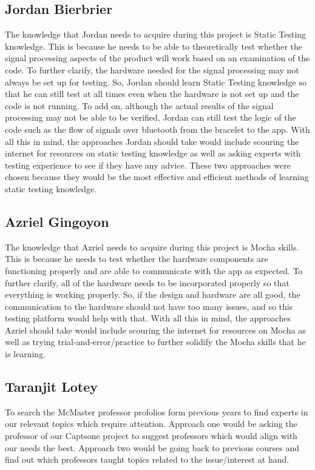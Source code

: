 \documentclass[12pt, titlepage]{article}
\begin{document}
\subsection*{Jordan Bierbrier}
The knowledge that Jordan needs to acquire during this project is Static Testing knowledge.
This is because he needs to be able to theoretically test whether the signal processing aspects of the product will work based on an examination of the code.
To further clarify, the hardware needed for the signal processing may not always be set up for testing.
So, Jordan should learn Static Testing knowledge so that he can still test at all times even when the hardware is not set up and the code is not running.
To add on, although the actual results of the signal processing may not be able to be verified, Jordan can still test the logic of the code such as the flow of signals over bluetooth from the bracelet to the app.
With all this in mind, the approaches Jordan should take would include scouring the internet for resources on static testing knowledge as well as asking experts with testing experience to see if they have any advice.
These two approaches were chosen because they would be the most effective and efficient methods of learning static testing knowledge.

\subsection*{Azriel Gingoyon}
The knowledge that Azriel needs to acquire during this project is Mocha skills.
This is because he needs to test whether the hardware components are functioning properly and are able to communicate with the app as expected.
To further clarify, all of the hardware needs to be incorporated properly so that everything is working properly.
So, if the design and hardware are all good, the communication to the hardware should not have too many issues, and so this testing platform would help with that.
With all this in mind, the approaches Azriel should take would include scouring the internet for resources on Mocha as well as trying trial-and-error/practice to further solidify the Mocha skills that he is learning. 

\subsection*{Taranjit Lotey}
To search the McMaster professor profolios form previous years to find experts in our relevant topics which require attention. Approach one would be asking the professor of our Captsone project to suggest professors which would align with our needs the best. Approach two would be going back to previous courses and find out which professors taught topics related to the issue/interest at hand.
\end{document}

